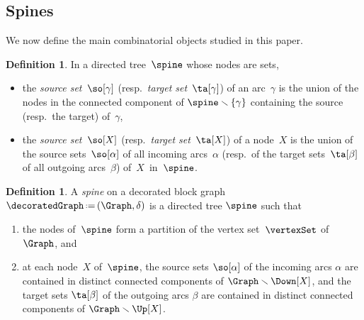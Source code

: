 \documentclass{amsart}
\theoremstyle{definition}
\newtheorem{definition}[theorem]{Definition}
\newcommand{\ssm}{\smallsetminus} %
\newcommand{\eqdef}{\mbox{\,\raisebox{0.2ex}{\scriptsize\ensuremath{\mathrm:}}\ensuremath{=}\,}} %
\newcommand{\darkblue}{\color{darkblue}} %
\newcommand{\defn}[1]{\textsl{\darkblue #1}} %
\newcommand{\decoration}{\delta}
\begin{document}

\subsection{Spines}
\label{subsec:spines}

We now define the main combinatorial objects studied in this paper.

\begin{definition}
  \label{def:sourceTargetSets}
  In a directed tree~$\spine$ whose nodes are sets,
  \begin{itemize}
    \item the \defn{source set}~$\so[\gamma]$ (resp.~\defn{target set}~$\ta[\gamma]$) of an arc~$\gamma$ is the union of the nodes in the connected component of $\spine \ssm \{\gamma\}$ containing the source (resp.~the target) of~$\gamma$,
    \item the \defn{source set}~$\so[X]$ (resp.~\defn{target set}~$\ta[X]$) of a node~$X$ is the union of the source sets~$\so[\alpha]$ of all incoming arcs~$\alpha$ (resp.~of the target sets~$\ta[\beta]$ of all outgoing arcs~$\beta$) of~$X$~in~$\spine$.
  \end{itemize}
\end{definition}

\begin{definition}
  \label{def:spine}
  A \defn{spine} on a decorated block graph $\decoratedGraph \eqdef (\Graph,\decoration)$ is a directed tree $\spine$ such that
  \begin{enumerate}
    \item the nodes of~$\spine$ form a partition of the vertex set~$\vertexSet$ of~$\Graph$, and 
    \item at each node~$X$ of~$\spine$, the source sets $\so[\alpha]$ of the incoming arcs $\alpha$ are contained in distinct connected components of $\Graph \ssm \Down[X]$, and the target sets $\ta[\beta]$ of the outgoing arcs $\beta$ are contained in distinct connected components of $\Graph \ssm \Up[X]$.
  \end{enumerate}
\end{definition}
\end{document}
